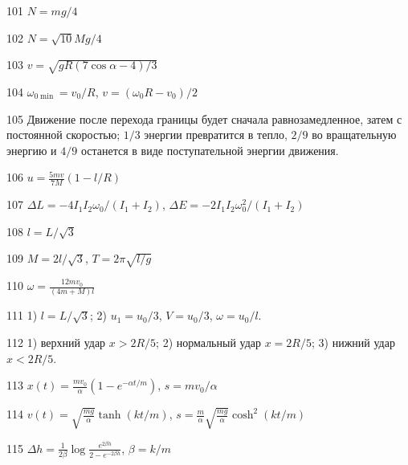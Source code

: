 \begin{Answer}{101}
$N = mg/4$
\end{Answer}
\begin{Answer}{102}
$N=\sqrt{10}Mg/4$
\end{Answer}
\begin{Answer}{103}
$v=\sqrt{gR(7\cos \alpha - 4)/3}$
\end{Answer}
\begin{Answer}{104}
$\omega_{0 \min} = v_0/R$, $v= (\omega_0R - v_0)/2$
\end{Answer}
\begin{Answer}{105}
Движение после перехода границы будет сначала равнозамедленное, затем с постоянной скоростью; $1/3$ энергии превратится в тепло, $2/9$ во вращательную энергию и $4/9$ останется в виде поступательной энергии движения.
\end{Answer}
\begin{Answer}{106}
$u = \frac{5mv}{7M}\left( 1 - l/R \right)$
\end{Answer}
\begin{Answer}{107}
$\Delta L = -4I_1I_2\omega_0/(I_1+I_2)$, $\Delta E = -2I_1I_2\omega_0^2/(I_1+I_2)$
\end{Answer}
\begin{Answer}{108}
$l = L/\sqrt{3}$
\end{Answer}
\begin{Answer}{109}
$M=2l/\sqrt{3}$, $T = 2\pi \sqrt{l/g}$
\end{Answer}
\begin{Answer}{110}
$\omega = \frac{12mv_0}{(4m+M)l}$
\end{Answer}
\begin{Answer}{111}
1) $l = L/\sqrt{3}$; 2) $u_1 = u_0/3$, $V=u_0/3$, $\omega = u_0/l$.
\end{Answer}
\begin{Answer}{112}
1) верхний удар $x > 2R/5$; 2) нормальный удар $x = 2R/5$; 3) нижний удар $x < 2R/5$.
\end{Answer}
\begin{Answer}{113}
$x(t) = \frac{mv_0}{\alpha}\left( 1 - e^{-\alpha t /m}\right)$, $s = mv_0/\alpha$
\end{Answer}
\begin{Answer}{114}
$v(t) = \sqrt{\frac{mg}{\alpha}} \tanh (kt/m)$, $s = \frac{m}{\alpha} \sqrt{\frac{mg}{\alpha}} \cosh^2 (kt/m)$
\end{Answer}
\begin{Answer}{115}
$\Delta h = \frac{1}{2\beta} \log \frac{e^{2\beta h}}{2 - e^{-2\beta h}}$, $\beta = k/m$
\end{Answer}
